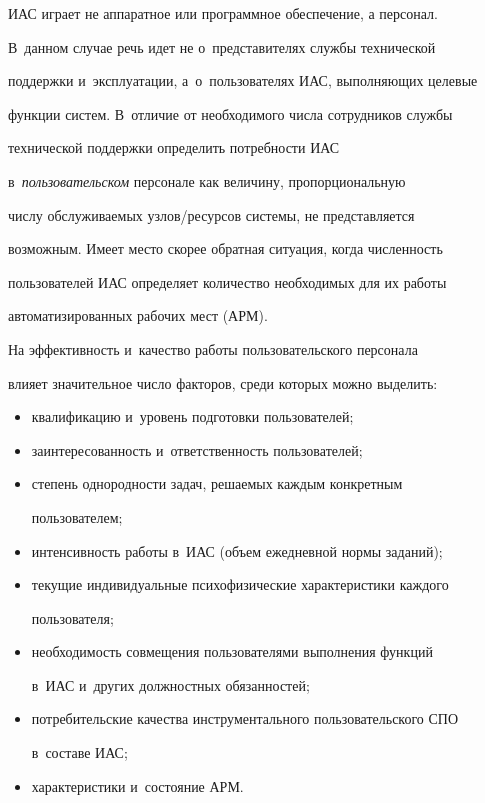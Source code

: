 ИАС играет не аппаратное или программное обеспечение, а персонал. 


В~данном случае речь идет не о~представителях службы технической 


поддержки и~эксплуатации, а~о~пользователях ИАС, выполняющих целевые 


функции систем. В~отличие от необходимого числа сотрудников службы 


технической поддержки определить потребности ИАС 


в~\textit{пользовательском} персонале как величину, пропорциональную 


числу обслуживаемых уз\-лов\!/\!ре\-сур\-сов системы, не пред\-став\-ля\-ет\-ся 


возможным. Имеет место скорее обратная ситуация, когда численность 


пользователей ИАС определяет количество необходимых для их работы 


автоматизированных рабочих мест (АРМ).


      


      На эффективность и~качество работы пользовательского персонала 


влияет значительное число факторов, среди которых можно выделить:


      \begin{itemize}


\item квалификацию и~уровень подготовки пользователей;


\item заинтересованность и~ответственность пользователей;


\item степень однородности задач, решаемых каждым конкретным 


пользователем;


\item интенсивность работы в~ИАС (объем ежедневной нормы заданий);


\item текущие индивидуальные психофизические характеристики каждого 


пользователя;


\item необходимость совмещения пользователями выполнения функций 


в~ИАС и~других должностных обязанностей;





\pagebreak





\item потребительские качества инструментального пользовательского СПО 


в~составе ИАС;


\item характеристики и~состояние АРМ.


\end{itemize}





